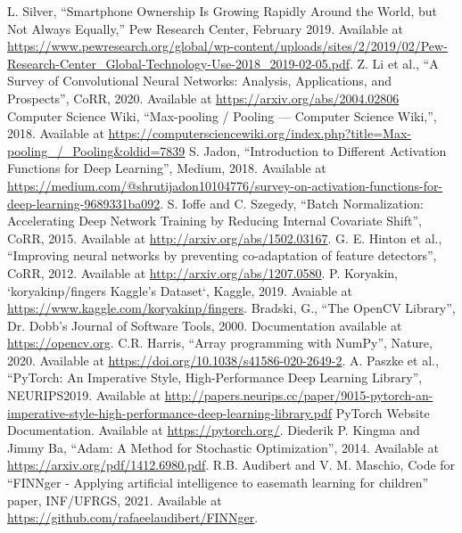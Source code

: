 \documentclass[conference]{IEEEtran}
\begin{document}
\begin{thebibliography}{00}
 L. Silver, ``Smartphone Ownership Is Growing Rapidly Around the World, but Not Always Equally,'' Pew Research Center, February 2019. Available at \url{https://www.pewresearch.org/global/wp-content/uploads/sites/2/2019/02/Pew-Research-Center_Global-Technology-Use-2018_2019-02-05.pdf}.
 Z. Li et al., ``A Survey of Convolutional Neural Networks: Analysis, Applications,
               and Prospects'', CoRR, 2020. Available at \url{https://arxiv.org/abs/2004.02806}
 Computer Science Wiki, ``Max-pooling / Pooling --- Computer Science Wiki{,}'', 2018. Available at \url{https://computersciencewiki.org/index.php?title=Max-pooling_/_Pooling&oldid=7839}
 S. Jadon, ``Introduction to Different Activation Functions for Deep Learning'', Medium, 2018. Available at \url{https://medium.com/@shrutijadon10104776/survey-on-activation-functions-for-deep-learning-9689331ba092}.
 S. Ioffe and C. Szegedy, ``Batch Normalization: Accelerating Deep Network Training by Reducing Internal Covariate Shift'', CoRR, 2015. Available at \url{http://arxiv.org/abs/1502.03167}.
 G. E. Hinton et al., ``Improving neural networks by preventing co-adaptation of feature detectors'', CoRR, 2012. Available at \url{http://arxiv.org/abs/1207.0580}.
 P. Koryakin, `koryakinp/fingers Kaggle's Dataset`, Kaggle, 2019. Avaiable at \url{https://www.kaggle.com/koryakinp/fingers}.
 Bradski, G., ``The OpenCV Library'', Dr. Dobb's Journal of Software Tools, 2000. Documentation available at \url{https://opencv.org}.
 C.R. Harris, ``Array programming with {NumPy}'', Nature, 2020. Available at \url{https://doi.org/10.1038/s41586-020-2649-2}.
 A. Paszke et al.,  ``PyTorch: An Imperative Style, High-Performance Deep Learning Library'', NEURIPS2019. Available at \url{http://papers.neurips.cc/paper/9015-pytorch-an-imperative-style-high-performance-deep-learning-library.pdf}
 PyTorch Website Documentation. Available at \url{https://pytorch.org/}.
 Diederik P. Kingma and Jimmy Ba, ``Adam: A Method for Stochastic Optimization'', 2014. Available at \url{https://arxiv.org/pdf/1412.6980.pdf}.
 R.B. Audibert and V. M. Maschio, Code for ``FINNger - Applying artificial intelligence to easemath learning for children'' paper, INF/UFRGS, 2021. Available at \url{https://github.com/rafaeelaudibert/FINNger}.
\end{thebibliography}
\end{document}
